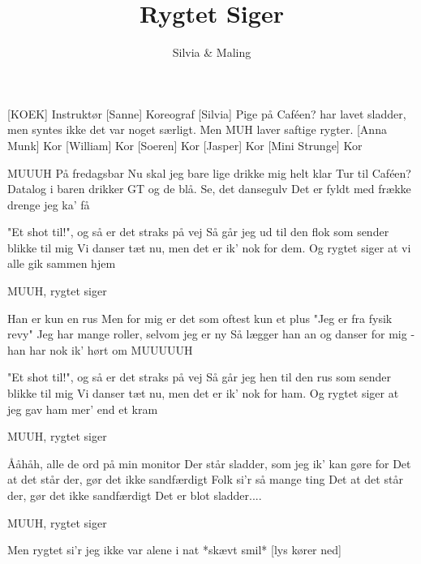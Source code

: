 \documentclass[a4paper,11pt]{article}
\title{Rygtet Siger}
\author{Silvia \& Maling}
\begin{document}
\maketitle

\begin{roles}
[KOEK] Instruktør
[Sanne] Koreograf
[Silvia] Pige på Caféen? har lavet sladder, men syntes ikke det var noget særligt. Men MUH laver saftige rygter.
[Anna Munk] Kor
[William] Kor
[Soeren] Kor
[Jasper] Kor
[Mini Strunge] Kor
\end{roles}

\begin{song}
   MUUUH 
På fredagsbar
Nu skal jeg bare lige drikke mig helt klar
Tur til Caféen?
Datalog i baren drikker GT og de blå. 
Se, det dansegulv
Det er fyldt med frække drenge jeg ka' få

"Et shot til!", og så er det straks på vej
Så går jeg ud til den flok som sender blikke til mig
Vi danser tæt nu, men det er ik' nok for dem.
Og rygtet siger at vi alle gik sammen hjem

MUUH, rygtet siger 

Han er kun en rus
Men for mig er det som oftest kun et plus
"Jeg er fra fysik revy"
Jeg har mange roller, selvom jeg er ny
Så lægger han an og danser for mig - han har nok ik' hørt om MUUUUUH

"Et shot til!", og så er det straks på vej
Så går jeg hen til den rus som sender blikke til mig
Vi danser tæt nu, men det er ik' nok for ham.
Og rygtet siger at jeg gav ham mer' end et kram 

MUUH, rygtet siger 

Ååhåh, alle de ord på min monitor
Der står sladder, som jeg ik' kan gøre for
Det at det står der, gør det ikke sandfærdigt
Folk si'r så mange ting
Det at det står der, gør det ikke sandfærdigt
Det er blot sladder....

MUUH, rygtet siger 

Men rygtet si’r jeg ikke var alene i nat *skævt smil* [lys kører ned]

\end{song}
\end{document}
